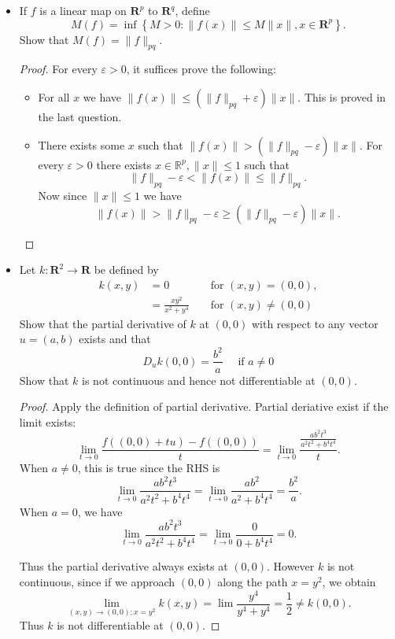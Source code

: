 \begin{itemize}
\item [21.M.] If $f$ is a linear map on $\mathbf{R}^p$ to $\mathbf{R}^q$, define
\[
M(f)=\inf \left\{M>0:\|f(x)\| \leq M\|x\|, x \in \mathbf{R}^p\right\} .
\]
Show that $M(f)=\|f\|_{p q}$.
\begin{proof}
	For every $\varepsilon>0$, it suffices prove the following: 
	\begin{itemize} 
		\item For all $x$ we have $\|f(x)\|\le (\|f\|_{pq}+\varepsilon) \|x\|$.  This is proved in the last question.  
		\item There exists some $x$ such that $\|f(x)\| > (\|f\|_{pq}-\varepsilon) \|x\|$.
		For every $\varepsilon>0$ there exists $x \in \mathbb{R}^p, \|x\|\le 1$ such that
			\[
				\|f\|_{pq} - \varepsilon < \| f(x)\| \le \|f \|_{pq}
			.\] 
		Now since $\|x\|\le 1$ we have
		\[
			\|f(x) \|>  \|f \|_{pq } - \varepsilon  \ge \left( \|f \|_{pq } - \varepsilon \right) \|x\|
		.\] 
	\end{itemize}
\end{proof}

\item [39.D.] Let $k: \boldsymbol{R}^2 \rightarrow \boldsymbol{R}$ be defined by
\[
\begin{aligned}
k(x, y) & =0 & & \text { for }(x, y)=(0,0), \\
& =\frac{x y^2}{x^2+y^4} & & \text { for }(x, y) \neq(0,0)
\end{aligned}
\]
Show that the partial derivative of $k$ at $(0,0)$ with respect to any vector $u=(a, b)$ exists and that
\[
D_u k(0,0)=\frac{b^2}{a} \quad \text { if } a \neq 0
\]
Show that $k$ is not continuous and hence not differentiable at $(0,0)$.
\begin{proof}
	Apply the definition of partial derivative. Partial deriative exist if the limit exists:
	\[
		\lim_{t \to 0} \frac{f((0,0) + t u) - f((0,0))}{t} = \lim_{t \to 0} \frac{\frac{ab^2t^3}{a^2 t^2 + b^4 t^4}}{t}
	.\] 
	When $a\neq 0$, this is true since the RHS is
	\[
		\lim_{t \to 0} \frac{ab^2t^3}{a^2t^2 + b^4 t^4} = \lim_{t \to 0} \frac{ab^2 }{a^2 + b^4t^4} = \frac{b^2}{a}
	.\] 
	When $a = 0$, we have
	\[
		\lim_{t \to 0} \frac{ab^2t^3}{a^2t^2 + b^4 t^4} = \lim_{t \to 0} \frac{0}{0+ b^4t^4} = 0
	.\] 
	
	Thus the partial derivative always exists at $(0,0)$. However $k$ is not continuous, since if we approach $(0,0)$ along the path $x = y^2$, we obtain
	 \[
		\lim_{(x,y) \to (0,0); x = y^2} k(x,y) = \lim \frac{y^4}{y^4 + y^4}  = \frac{1}{2} \neq  k(0,0)
	.\] 
	Thus $k$ is not differentiable at $(0,0)$.
\end{proof}


\end{itemize}
